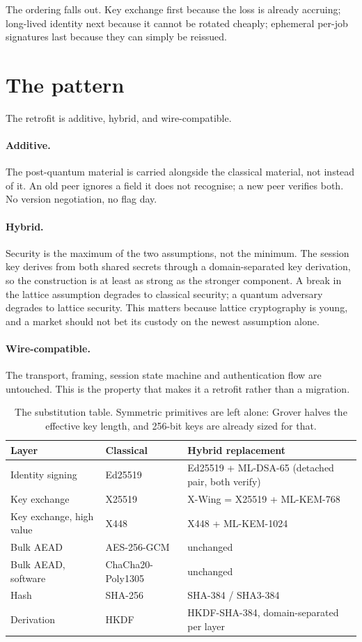 \documentclass[11pt,a4paper]{article}
\begin{document}
The ordering falls out. Key exchange first because the loss is already
accruing; long-lived identity next because it cannot be rotated cheaply;
ephemeral per-job signatures last because they can simply be reissued.

\section{The pattern}

The retrofit is additive, hybrid, and wire-compatible.

\paragraph{Additive.} The post-quantum material is carried alongside the
classical material, not instead of it. An old peer ignores a field it does not
recognise; a new peer verifies both. No version negotiation, no flag day.

\paragraph{Hybrid.} Security is the maximum of the two assumptions, not the
minimum. The session key derives from both shared secrets through a
domain-separated key derivation, so the construction is at least as strong as
the stronger component. A break in the lattice assumption degrades to classical
security; a quantum adversary degrades to lattice security. This matters because
lattice cryptography is young, and a market should not bet its custody on the
newest assumption alone.

\paragraph{Wire-compatible.} The transport, framing, session state machine and
authentication flow are untouched. This is the property that makes it a retrofit
rather than a migration.

\begin{table}[h]
\centering
\begin{tabular}{lll}
\toprule
Layer & Classical & Hybrid replacement \\
\midrule
Identity signing & Ed25519 & Ed25519 + ML-DSA-65 (detached pair, both verify) \\
Key exchange & X25519 & X-Wing = X25519 + ML-KEM-768 \\
Key exchange, high value & X448 & X448 + ML-KEM-1024 \\
Bulk AEAD & AES-256-GCM & unchanged \\
Bulk AEAD, software & ChaCha20-Poly1305 & unchanged \\
Hash & SHA-256 & SHA-384 / SHA3-384 \\
Derivation & HKDF & HKDF-SHA-384, domain-separated per layer \\
\bottomrule
\end{tabular}
\caption{The substitution table. Symmetric primitives are left alone: Grover
halves the effective key length, and 256-bit keys are already sized for that.}
\end{table}
\end{document}
